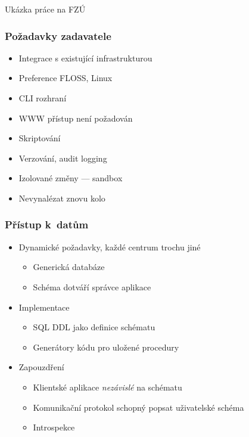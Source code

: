 \documentclass{beamer}
\begin{document}
\begin{frame}[fragile]
\begin{center}
Ukázka práce na FZÚ
\end{center}
\end{frame}


\begin{frame}[fragile]
\frametitle{Požadavky zadavatele}
\begin{itemize}
    \item Integrace s existující infrastrukturou
    \item Preference FLOSS, Linux
    \item CLI rozhraní
    \item WWW přístup není požadován
    \item Skriptování
    \item Verzování, audit logging
    \item Izolované změny --- sandbox
    \item Nevynalézat znovu kolo
\end{itemize}
\end{frame}


\begin{frame}[fragile]
\frametitle{Přístup k~datům}
\begin{itemize}
    \item Dynamické požadavky, každé centrum trochu jiné
        \begin{itemize}
            \item Generická databáze
            \item Schéma dotváří správce aplikace
        \end{itemize}
    \item Implementace
        \begin{itemize}
            \item SQL DDL jako definice schématu
            \item Generátory kódu pro uložené procedury
        \end{itemize}
    \item Zapouzdření
        \begin{itemize}
            \item Klientské aplikace {\em nezávislé} na schématu
            \item Komunikační protokol schopný popsat uživatelské schéma
            \item Introspekce
        \end{itemize}
\end{itemize}
\end{frame}
\end{document}
